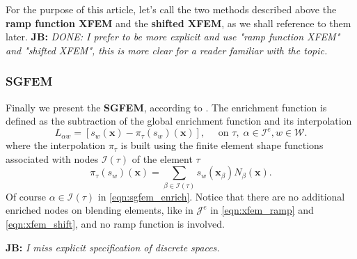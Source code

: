 \documentclass[preprint,12pt]{elsarticle}
\def\vc#1{\mathbf{\boldsymbol{#1}}}     %
\newcommand{\bx}{\vc{x}}
\newcommand{\noteJB}[1]{{\color{Blue} \textbf{JB: } \textit{#1}}}
\begin{document}
For the purpose of this article, let's call the two methods described above the \textbf{ramp function XFEM}  
and the \textbf{shifted XFEM}, as we shall reference to them later.
\noteJB{DONE: I prefer to be more explicit and use "ramp function XFEM" and "shifted XFEM", 
this is more clear for a reader familiar with the topic.}

\subsubsection{SGFEM}
Finally we present the \textbf{SGFEM}, according to \cite{sgfem,sgfem2013}. The enrichment function is defined
as the subtraction of the global enrichment function and its interpolation 
\begin{equation} \label{eqn:sgfem_enrich}
    L_{\alpha w} = \left[s_w(\bx) - \pi_\tau (s_w)(\bx)\right],
    \quad \textrm{ on } \tau,\; \alpha\in\mathcal{I}^e, w\in\mathcal{W}.
\end{equation} 
where the interpolation $\pi_\tau$ is built using the finite element shape functions
associated with nodes $\mathcal{I}(\tau)$ of the element $\tau$
\begin{equation} \label{eqn:sgfem_interpolation}
    \pi_\tau (s_w)(\bx) = \sum\limits_{\beta\in\mathcal{I}(\tau)} s_w(\bx_\beta) N_\beta(\bx).
\end{equation}
Of course $\alpha\in\mathcal{I}(\tau)$ in \eqref{eqn:sgfem_enrich}.
Notice that there are no additional enriched nodes on blending elements, like in $\mathcal{J}^e$ in 
\eqref{eqn:xfem_ramp} and \eqref{eqn:xfem_shift}, and no ramp function is involved.

\noteJB{I miss explicit specification of discrete spaces.}
\end{document}
